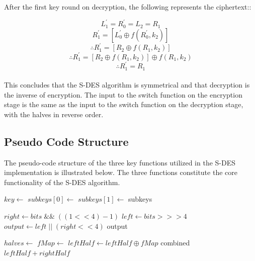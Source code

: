 \documentclass[]{article}
\begin{document}
\noindent After the first key round on decryption, the following represents the ciphertext::

$$L^{'}_1=R^{'}_0=L_2=R_1$$
$$R^{'}_1=[L^{'}_0\oplus f(R^{'}_0,k_2)]$$
$$\therefore R^{'}_1=[R_2\oplus f(R_1,k_2)]$$
$$\therefore R^{'}_1=[R_2\oplus f(R_1,k_2)]\oplus f(R_1,k_2)$$
$$\therefore R^{'}_1=R_1$$\\

\noindent
This concludes that the S-DES algorithm is symmetrical and that decryption is the inverse of encryption. The input to the switch function on the encryption stage is the same as the input to the switch function on the decryption stage, with the halves in reverse order.

\newpage
\subsection*{Pseudo Code Structure}

The pseudo-code structure of the three key functions utilized in the S-DES implementation is illustrated below. The three functions constitute the core functionality of the S-DES algorithm.\\

\begin{algorithmic}
	\State $key\gets $ 
	\State {}
	\State $subkeys[0]\gets $ 
	\State {}
	\State $subkeys[1]\gets $ 
	\State \Return subkeys
\EndFunction
\end{algorithmic}


\vspace{0.5cm}

\begin{algorithmic}
		\State $ right \gets bits \;\&\&\; ( ( 1 << 4 ) - 1 ) $
		\State $ left \gets bits >>> 4 $
		\State $ output \gets left \;||\; ( right << 4 )$
		\State \Return output
	\EndFunction
\end{algorithmic}

\vspace{0.5cm}

\begin{algorithmic}
	
	\State $halves\gets $ 
	\State $fMap \gets $ 	
	\State $ leftHalf \gets leftHalf \oplus fMap $
	\State \Return combined $ leftHalf + rightHalf $
	\EndFunction
\end{algorithmic}
\end{document}
